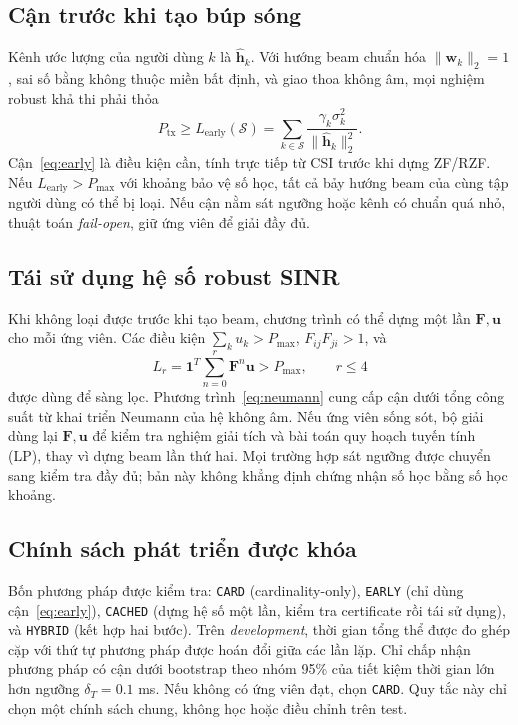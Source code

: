 \documentclass[11pt,onecolumn]{IEEEtran}
\begin{document}
\subsection{Cận trước khi tạo búp sóng}
Kênh ước lượng của người dùng $k$ là $\widehat{\mathbf h}_k$. Với hướng beam chuẩn hóa $\|\mathbf w_k\|_2=1$, sai số bằng không thuộc miền bất định, và giao thoa không âm, mọi nghiệm robust khả thi phải thỏa
\begin{equation}
P_{\mathrm{tx}}\geq
L_{\mathrm{early}}(\mathcal S)
=\sum_{k\in\mathcal S}\frac{\gamma_k\sigma_k^2}{\|\widehat{\mathbf h}_k\|_2^2}.
\label{eq:early}
\end{equation}
Cận~\eqref{eq:early} là điều kiện cần, tính trực tiếp từ CSI trước khi dựng ZF/RZF. Nếu $L_{\mathrm{early}}>P_{\max}$ với khoảng bảo vệ số học, tất cả bảy hướng beam của cùng tập người dùng có thể bị loại. Nếu cận nằm sát ngưỡng hoặc kênh có chuẩn quá nhỏ, thuật toán \emph{fail-open}, giữ ứng viên để giải đầy đủ.

\subsection{Tái sử dụng hệ số robust SINR}
Khi không loại được trước khi tạo beam, chương trình có thể dựng một lần $\mathbf F,\mathbf u$ cho mỗi ứng viên. Các điều kiện $\sum_k u_k>P_{\max}$, $F_{ij}F_{ji}>1$, và
\begin{equation}
L_r=\mathbf1^T\sum_{n=0}^{r}\mathbf F^n\mathbf u>P_{\max},\qquad r\leq4
\label{eq:neumann}
\end{equation}
được dùng để sàng lọc. Phương trình~\eqref{eq:neumann} cung cấp cận dưới tổng công suất từ khai triển Neumann của hệ không âm. Nếu ứng viên sống sót, bộ giải dùng lại $\mathbf F,\mathbf u$ để kiểm tra nghiệm giải tích và bài toán quy hoạch tuyến tính (LP), thay vì dựng beam lần thứ hai. Mọi trường hợp sát ngưỡng được chuyển sang kiểm tra đầy đủ; bản này không khẳng định chứng nhận số học bằng số học khoảng.

\subsection{Chính sách phát triển được khóa}
Bốn phương pháp được kiểm tra: \texttt{CARD} (cardinality-only), \texttt{EARLY} (chỉ dùng cận~\eqref{eq:early}), \texttt{CACHED} (dựng hệ số một lần, kiểm tra certificate rồi tái sử dụng), và \texttt{HYBRID} (kết hợp hai bước). Trên \emph{development}, thời gian tổng thể được đo ghép cặp với thứ tự phương pháp được hoán đổi giữa các lần lặp. Chỉ chấp nhận phương pháp có cận dưới bootstrap theo nhóm 95\% của tiết kiệm thời gian lớn hơn ngưỡng $\delta_T=0.1$ ms. Nếu không có ứng viên đạt, chọn \texttt{CARD}. Quy tắc này chỉ chọn một chính sách chung, không học hoặc điều chỉnh trên test.
\end{document}
